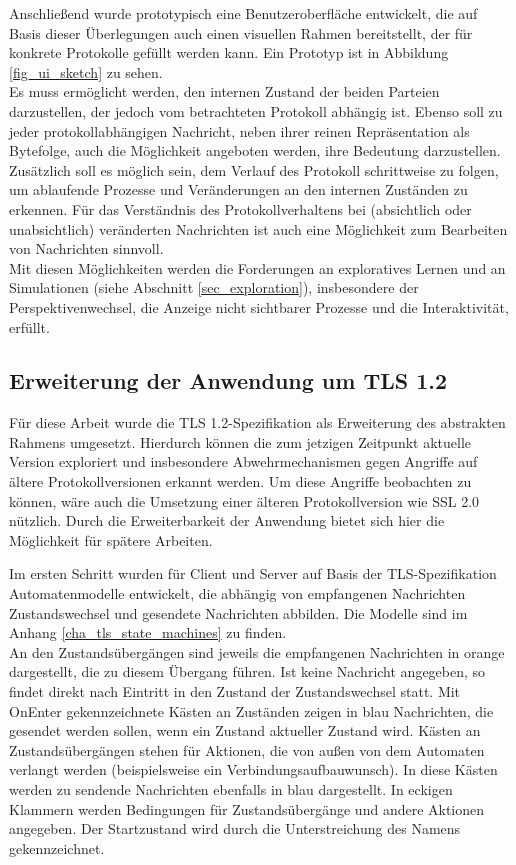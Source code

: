 Anschließend wurde prototypisch eine Benutzeroberfläche entwickelt, die auf Basis dieser Überlegungen auch einen visuellen Rahmen bereitstellt, der für konkrete Protokolle gefüllt werden kann. Ein Prototyp ist in Abbildung \ref{fig_ui_sketch} zu sehen.\\
Es muss ermöglicht werden, den internen Zustand der beiden Parteien darzustellen, der jedoch vom betrachteten Protokoll abhängig ist. Ebenso soll zu jeder protokollabhängigen Nachricht, neben ihrer reinen Repräsentation als Bytefolge, auch die Möglichkeit angeboten werden, ihre Bedeutung darzustellen. Zusätzlich soll es möglich sein, dem Verlauf des Protokoll schrittweise zu folgen, um ablaufende Prozesse und Veränderungen an den internen Zuständen zu erkennen. Für das Verständnis des Protokollverhaltens bei (absichtlich oder unabsichtlich) veränderten Nachrichten ist auch eine Möglichkeit zum Bearbeiten von Nachrichten sinnvoll.\\
Mit diesen Möglichkeiten werden die Forderungen an exploratives Lernen und an Simulationen (siehe Abschnitt \ref{sec_exploration}), insbesondere der Perspektivenwechsel, die Anzeige nicht sichtbarer Prozesse und die Interaktivität, erfüllt.

\subsection{Erweiterung der Anwendung um TLS 1.2}
\label{sec_analysis_tls_plugin}

Für diese Arbeit wurde die TLS 1.2-Spezifikation als Erweiterung des abstrakten Rahmens umgesetzt. Hierdurch können die zum jetzigen Zeitpunkt aktuelle Version exploriert und insbesondere Abwehrmechanismen gegen Angriffe auf ältere Protokollversionen erkannt werden. Um diese Angriffe beobachten zu können, wäre auch die Umsetzung einer älteren Protokollversion wie SSL 2.0 nützlich. Durch die Erweiterbarkeit der Anwendung bietet sich hier die Möglichkeit für spätere Arbeiten.

Im ersten Schritt wurden für Client und Server auf Basis der TLS-Spezifikation Automatenmodelle entwickelt, die abhängig von empfangenen Nachrichten Zustandswechsel und gesendete Nachrichten abbilden. Die Modelle sind im Anhang \ref{cha_tls_state_machines} zu finden.\\
An den Zustandsübergängen sind jeweils die empfangenen Nachrichten in orange dargestellt, die zu diesem Übergang führen. Ist keine Nachricht angegeben, so findet direkt nach Eintritt in den Zustand der Zustandswechsel statt. Mit OnEnter gekennzeichnete Kästen an Zuständen zeigen in blau Nachrichten, die gesendet werden sollen, wenn ein Zustand aktueller Zustand wird. Kästen an Zustandsübergängen stehen für Aktionen, die von außen von dem Automaten verlangt werden (beispielsweise ein Verbindungsaufbauwunsch). In diese Kästen werden zu sendende Nachrichten ebenfalls in blau dargestellt. In eckigen Klammern werden Bedingungen für Zustandsübergänge und andere Aktionen angegeben. Der Startzustand wird durch die Unterstreichung des Namens gekennzeichnet.
 
